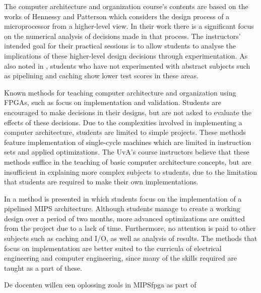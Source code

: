 \documentclass[openright]{template/uva-bachelor-thesis}
\begin{document}
The computer architecture and organization course's contents are based on the works of Hennessy and Patterson \cite{hennessy2013computer} which considers the design process of a microprocessor from a higher-level view. In their work there is a significant focus on the numerical analysis of decisions made in that process. The instructors' intended goal for their practical sessions is to allow students to analyse the implications of these higher-level design decisions through experimentation. As also noted in \cite{paharsingh2009novel}, students who have not experimented with abstract subjects such as pipelining and caching show lower test scores in these areas.

Known methods for teaching computer architecture and organization using FPGAs, such as \cite{paharsingh2009novel, el2011teaching, nakano2008processor, al2007teaching, kellett2012project, jansen2014every, pereira2012basic, cifredo2015computer} focus on implementation and validation. Students are encouraged to make decisions in their designs, but are not asked to evaluate the effects of these decisions. Due to the complexities involved in implementing a computer architecture, students are limited to simple projects. These methods feature implementation of single-cycle machines which are limited in instruction sets and applied optimizations. 
The UvA's course instructors believe that these methods suffice in the teaching of basic computer architecture concepts, but are insufficient in explaining more complex subjects to students, due to the limitation that students are required to make their own implementations.

In \cite{lee2012pipelined} a method is presented in which students focus on the implementation of a pipelined MIPS architecture. Although students manage to create a working design over a period of two months, more advanced optimizations are omitted from the project due to a lack of time. Furthermore, no attention is paid to other subjects such as caching and I/O, as well as analysis of results. 
The methods that focus on implementation are better suited to the curricula of electrical engineering and computer engineering, since many of the skills required are taught as a part of these. 


De docenten willen een oplossing zoals in \cite{holland2003harnessing}  \cite{bulic2013fpga} MIPSfpga as part of \cite{mipsfpga}
\end{document}
